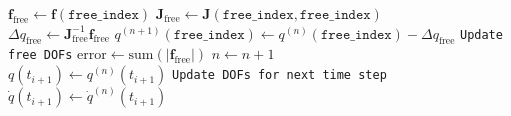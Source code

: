 \documentclass[letterpaper, 10 pt, conference]{ieeeconf}  %
\begin{document}
\begin{algorithm}[h]
\begin{algorithmic}[1]
                        \State $\mathbf{f}_\text{free} \gets \mathbf{f}(\texttt{free\_index})$
                        \State $\mathbf{J}_\text{free} \gets \mathbf{J}(\texttt{free\_index}, \texttt{free\_index})$\\
                        \State $\Delta q_\text{free} \gets \mathbf{J}_\text{free}^{-1} \mathbf{f}_\text{free}$
                        \State $q^{(n+1)}(\texttt{free\_index}) \gets q^{(n)}(\texttt{free\_index}) - \Delta q_\text{free}$ \hfill \texttt{Update free DOFs}
                        \State $\text{error} \gets \text{sum}(\lvert \mathbf{f}_\text{free} \rvert)$
                        \State $n \gets n + 1$ \\
                    \EndWhile
                    \State $q(t_{i+1}) \gets q^{(n)}(t_{i+1})$                  \hfill \texttt{Update DOFs for next time step}
                    \State $\dot{q}(t_{i+1}) \gets \dot{q}^{(n)}(t_{i+1})$
                \EndFunction
                \end{algorithmic}
                \end{algorithm}
\twocolumn




\addtolength{\textheight}{-12cm}   %





\end{document}
